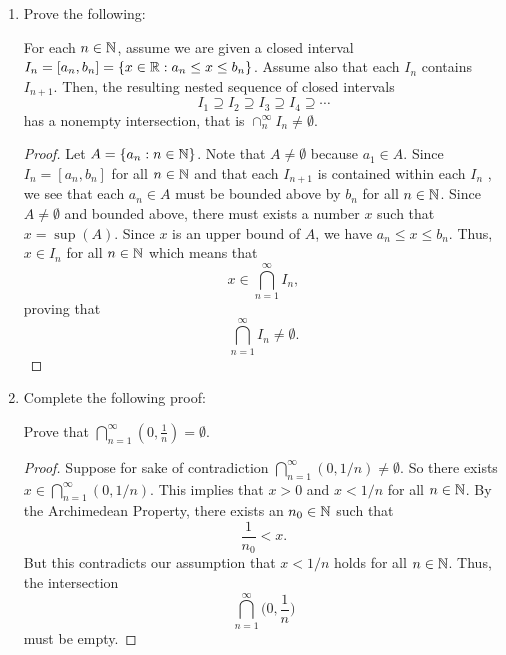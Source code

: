 \documentclass[11pt,a4paper]{article}
\begin{document}
\begin{enumerate}
\begin{enumerate}
\begin{proof}
            \end{proof}
    \end{enumerate}
    \item Prove the following:
        \begin{theorem}
            For each \( n \in \mathbb{N}  \), assume we are given a closed interval \( {I}_{n} = [{a}_{n}, {b}_{n}] = \{ x \in \mathbb{R} : {a}_{n} \leq x \leq {b}_{n} \}  \). Assume also that each \( {I}_{n} \) contains \( {I}_{n+1} \). Then, the resulting nested sequence of closed intervals
            \[  {I}_{1} \supseteq {I}_{2} \supseteq {I}_{3} \supseteq {I}_{4} \supseteq \cdots \]
            has a nonempty intersection, that is \( \cap_{n}^{\infty } {I}_{n} \neq \emptyset \).
        \end{theorem}
        \begin{proof}
            Let \( A = \{ {a}_{n} : n \in \mathbb{N}  \}  \). Note that \( A \neq \emptyset  \) because \( {a}_{1} \in A  \). Since \( {I}_{n} = [{a}_{n}, {b}_{n}]  \) for all \( n \in \mathbb{N}  \) and that each \( {I}_{n+1} \) is contained within each \( {I}_{n} \) , we see that each \( {a}_{n} \in A  \) must be bounded above by \( {b}_{n} \) for all \( n \in \mathbb{N}  \). Since \( A \neq \emptyset  \) and bounded above, there must exists a number \( x  \) such that \( x = \sup(A) \). Since \( x  \) is an upper bound of \( A  \), we have \( {a}_{n} \leq x \leq {b}_{n}  \). Thus, \( x \in {I}_{n}  \) for all \( n \in \mathbb{N}  \) which means that  
            \[  x \in \bigcap_{ n=1  }^{ \infty  }  {I}_{n}, \]
            proving that 
            \[  \bigcap_{ n = 1  }^{ \infty  } {I}_{n} \neq \emptyset. \]
        \end{proof}
    \item Complete the following proof:

        Prove that \( \bigcap_{ n = 1  }^{ \infty  } (0, \frac{ 1 }{ n } ) = \emptyset \). 
        \begin{proof}
        Suppose for sake of contradiction \( \bigcap_{ n=1  }^{ \infty  } (  0, 1/n   ) \neq \emptyset  \). So there exists \( x \in \bigcap_{ n=1 }^{ \infty  } (0, 1/n) \). This implies that \( x > 0  \) and \( x < 1/n \) for all \( n \in \mathbb{N}  \). By the Archimedean Property, there exists an \( {n}_{0} \in \mathbb{N}  \) such that   
        \[  \frac{ 1 }{ {n}_{0} }  < x.   \]
        But this contradicts our assumption that \( x < 1 /n   \) holds for all \( n \in \mathbb{N}  \). Thus, the intersection
        \[  \bigcap_{ n=1  }^{ \infty  }  \Big(  0 , \frac{ 1 }{ n }  \Big)  \]
        must be empty.
        \end{proof}
\end{enumerate}
\end{document}
